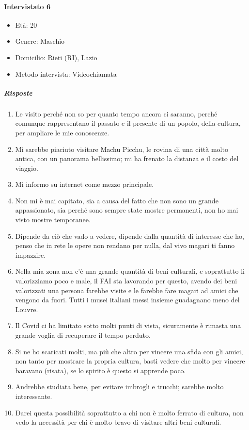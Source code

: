 \documentclass{article}
\begin{document}
\paragraph{Intervistato 6}
\begin{itemize}
\item Età: 20
\item Genere: Maschio
\item Domicilio: Rieti (RI), Lazio
\item Metodo intervista: Videochiamata
\end{itemize}
\subparagraph{Risposte}
\begin{enumerate}
\item Le visito perché non so per quanto tempo ancora ci saranno, perché comunque rappresentano il passato e il presente di un popolo, della cultura, per ampliare le mie conoscenze.
\item Mi sarebbe piaciuto visitare Machu Picchu, le rovina di una città molto antica, con un panorama bellissimo; mi ha frenato la distanza e il costo del viaggio.
\item Mi informo su internet come mezzo principale.
\item Non mi è mai capitato, sia a causa del fatto che non sono un grande appassionato, sia perché sono sempre state mostre permanenti, non ho mai visto mostre temporanee.
\item Dipende da ciò che vado a vedere, dipende dalla quantità di interesse che ho, penso che in rete le opere non rendano per nulla, dal vivo magari ti fanno impazzire.
\item Nella mia zona non c’è una grande quantità di beni culturali, e soprattutto li valorizziamo poco e male, il FAI sta lavorando per questo, avendo dei beni valorizzati una persona farebbe visite e le farebbe fare magari ad amici che vengono da fuori. Tutti i musei italiani messi insieme guadagnano meno del Louvre.
\item Il Covid ci ha limitato sotto molti punti di vista, sicuramente è rimasta una grande voglia di recuperare il tempo perduto.
\item Si ne ho scaricati molti, ma più che altro per vincere una sfida con gli amici, non tanto per mostrare la propria cultura, basti vedere che molto per vincere baravano (risata), se lo spirito è questo si apprende poco.
\item Andrebbe studiata bene, per evitare imbrogli e trucchi; sarebbe molto interessante.
\item Darei questa possibilità soprattutto a chi non è molto ferrato di cultura, non vedo la necessità per chi è molto bravo di visitare altri beni culturali.
\end{enumerate}
\end{document}
